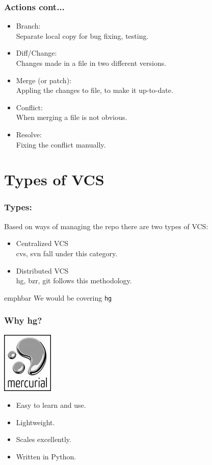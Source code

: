 \documentclass[14pt,compress]{beamer}
\newcommand{\emphbar}[1]
{\begin{beamercolorbox}[rounded=true]{emphbar} 
      {#1}
 \end{beamercolorbox}
}
\newcounter{time}
\newcommand{\inctime}[1]{\addtocounter{time}{#1}{\tiny \thetime\ m}}
\newcommand{\typ}[1]{\lstinline{#1}}
\begin{document}
\begin{frame}
  \frametitle{Actions cont...}
  \begin{itemize}
  \item Branch:\\
    Separate local copy for bug fixing, testing.
  \item Diff/Change:\\
    Changes made in a file in two different versions.
  \item Merge (or patch):\\
    Appling the changes to file, to make it up-to-date.
  \item Conflict:\\
    When merging a file is not obvious.
  \item Resolve:\\
    Fixing the conflict manually.
  \end{itemize}
\end{frame}

\section{Types of VCS}

\begin{frame}
  \frametitle{Types:}
  Based on ways of managing the repo there are two types of VCS:
  \begin{itemize}
  \item Centralized VCS\\
    cvs, svn fall under this category.
  \item Distributed VCS\\
    hg, bzr, git follows this methodology.
  \end{itemize}
  \emphbar{We would be covering \typ{hg}}
\end{frame}

\begin{frame}
  \frametitle{Why hg?}
    \includegraphics[height=.75in, interpolate=true]{mercurial}
  \begin{itemize}
  \item Easy to learn and use.
  \item Lightweight.
  \item Scales excellently.
  \item Written in Python.
  \end{itemize}
  \inctime{10}
\end{frame}
\end{document}
